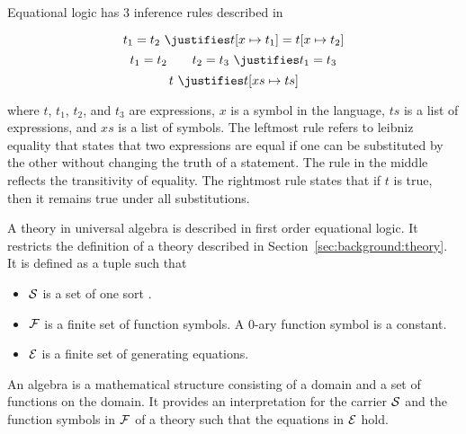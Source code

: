 Equational logic has $3$ inference rules described in~\cite{Gries1993EquationalLogic}  
\begin{proofrules}
        \[ t_1 = t_2 \ \justifies t[x \mapsto t_1] = t[x \mapsto t_2] \]
        \[ t_1 = t_2 \qquad t_2 = t_3 \ \justifies t_1 = t_3 \]
        \[t \ \justifies t [xs \mapsto ts] \] 
\end{proofrules}       
\noindent where $t$, $t_1$, $t_2$, and $t_3$ are expressions, $x$ is a symbol in the language, $ts$ is a list of expressions, and $xs$ is a list of symbols. 
The leftmost rule refers to leibniz equality that states that two expressions are equal if one can be substituted by the other without changing the truth of a statement. 
The rule in the middle reflects the transitivity of equality. 
The rightmost rule states that if $t$ is true, then it remains true under all substitutions.  

A theory in universal algebra is described in first order equational logic. It restricts the definition of a theory described in Section~\ref{sec:background:theory}. It is defined as a tuple \lstmath{($\sort$,$\fsyms$,$\equations$)}
such that 
\begin{itemize}
\item $\sort$ is a set of one sort . 
\item $\fsyms$ is a finite set of function symbols. A $0$-ary function symbol is a constant. 
\item $\equations$ is a finite set of generating equations. 
\end{itemize}

An algebra is a mathematical structure consisting of a domain and a set of functions on the domain. It provides an interpretation for the carrier $\sort$ and the function symbols in $\fsyms$ of a theory such that the equations in $\equations$ hold.  

